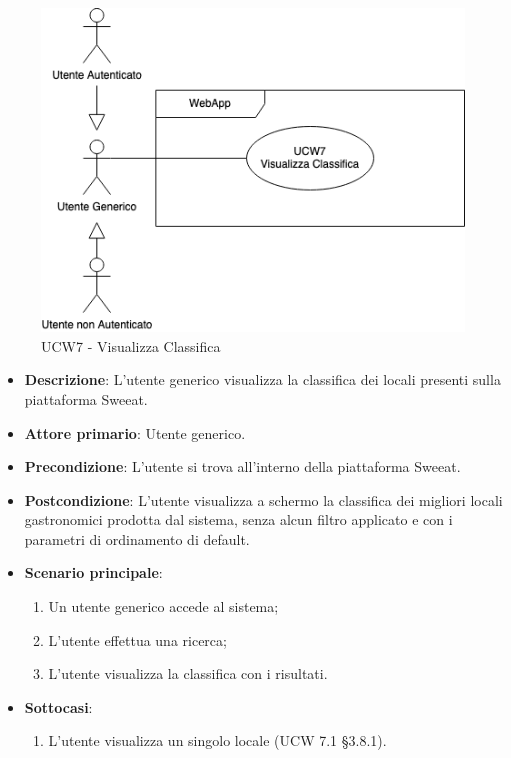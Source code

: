 \begin{figure}[H]
\centering
\includegraphics[scale=0.5]{UC_images/UCW7.png}
\caption{UCW7 - Visualizza Classifica}
\end{figure}
\begin{center}
\end{center}
\begin{itemize}
	\item \textbf{Descrizione}: L'utente generico visualizza la classifica dei locali presenti sulla piattaforma Sweeat.
    \item \textbf{Attore primario}: Utente generico.
    \item \textbf{Precondizione}: L’utente si trova all’interno della piattaforma Sweeat.
    \item \textbf{Postcondizione}: L’utente visualizza a schermo la classifica dei migliori locali gastronomici prodotta dal sistema, senza alcun filtro applicato e con i parametri di ordinamento di default.
    \item \textbf{Scenario principale}: 
    \begin{enumerate}
        \item Un utente generico accede al sistema;
        \item L’utente effettua una ricerca;
        \item L'utente visualizza la classifica con i risultati.
    \end{enumerate}
	\item \textbf{Sottocasi}:
	\begin{enumerate}
	\item L'utente visualizza un singolo locale (UCW 7.1 \S{3.8.1}).
	\end{enumerate}    
\end{itemize}

